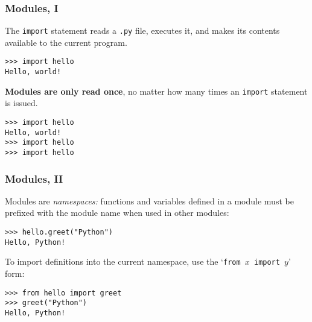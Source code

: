 \documentclass[english,serif,mathserif,xcolor=pdftex,dvipsnames,table]{beamer}
\begin{document}
\begin{frame}[fragile]
  \frametitle{Modules, I}
  The \texttt{import} statement reads a \texttt{.py} file, executes
  it, and makes its contents available to the current program.
\begin{lstlisting}
>>> import hello
Hello, world!
\end{lstlisting}

  \+
  \textbf{Modules are only read once}, no matter how many times an
  \texttt{import} statement is issued.
\begin{lstlisting}
>>> import hello
Hello, world!
>>> import hello
>>> import hello
\end{lstlisting}

\end{frame}


\begin{frame}[fragile]
  \frametitle{Modules, II}
  Modules are \emph{namespaces:} functions and variables defined in
  a module must be prefixed with the module name when used in other
  modules:
\begin{lstlisting}
>>> hello.greet("Python")
Hello, Python!
\end{lstlisting}

  \+
  To import definitions into the current namespace, use the
  `\texttt{from $x$ import $y$}' form:
\begin{lstlisting}
>>> from hello import greet
>>> greet("Python")
Hello, Python!
\end{lstlisting}
\end{frame}
\end{document}
